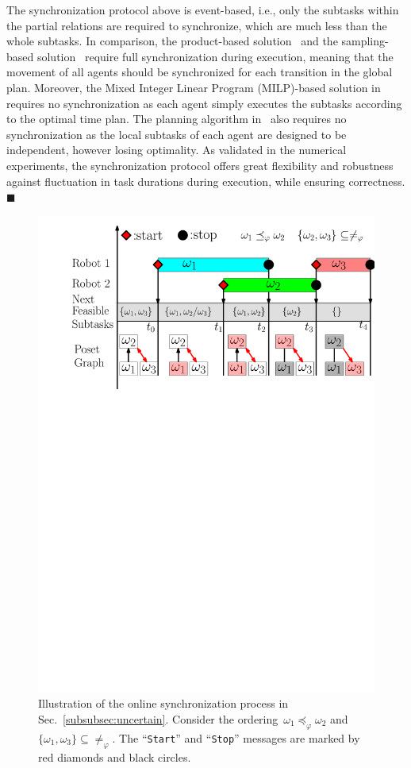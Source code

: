 \begin{remark}\label{remark:syn}
The synchronization protocol above is event-based,
i.e.,  only the subtasks within the partial relations
are required to synchronize,
which are much less than the whole subtasks.
In comparison, the product-based solution~\citep{baier2008principles}
and the sampling-based solution~\citep{kantaros2020stylus}
require full synchronization during execution,
meaning that the movement of all agents should be synchronized for each
transition in the global plan.
Moreover, the Mixed Integer Linear Program (MILP)-based solution
in~\citep{luo2021temporal, jones2019scratchs}
requires no synchronization as each agent simply executes the subtasks
according to the optimal time plan.
The planning algorithm in~\citep{schillinger2018simultaneous}
also requires no synchronization as the local subtasks of each agent
are designed to be independent, however losing optimality.
As validated in the numerical experiments,
the synchronization protocol offers great flexibility
and robustness against fluctuation in task durations during execution,
while ensuring correctness.
\hfill  $\blacksquare$
\end{remark}


\begin{figure}[t]
	\centering
	\includegraphics[width=0.8\linewidth]{figures/online_adapt3.pdf}
        \caption{
Illustration of the online synchronization process
in Sec.~\ref{subsubsec:uncertain}.
Consider the ordering~$\omega_1 \preceq_{\varphi}\omega_2$
and~$\{\omega_1, \omega_3\}\subseteq\neq_\varphi $.
The ``\texttt{Start}'' and ``\texttt{Stop}'' messages are
marked by red diamonds and black circles.}
\label{fig:online adaption}
\end{figure}



